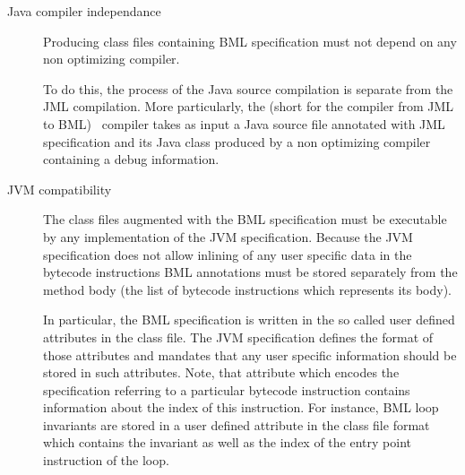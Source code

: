 \begin{description}

\item [Java compiler independance ] 
      Producing class files containing BML specification must not depend on 
      any non optimizing compiler. 
    
      To do this, the process of the Java source compilation is separate from the JML compilation. 
      More particularly, the \JMLtoBML (short for the compiler from JML to BML) \ compiler  takes as input a Java source file annotated with JML
      specification and its Java class produced by a non optimizing compiler containing a
      debug information.%
      

\item [JVM compatibility]
            The class files augmented with the BML specification must be executable by any
	    implementation of the JVM specification.
	     Because the JVM specification does not allow inlining of any user specific data in the bytecode instructions 
	    BML annotations must be stored separately from the method body (the list of bytecode instructions which represents its body).
	  
	    
	    In particular, the BML specification is written in the so
	    called user defined attributes in the class file.
	    The JVM specification defines the format of those attributes and mandates that any
	    user specific information should be stored in such attributes. 
	    Note, that attribute which encodes the specification  referring to a particular bytecode instruction contains
	    information about the index of this instruction. For instance,  BML loop invariants
	    are stored in a user defined attribute in the class file format which  contains the invariant
	    as well as the index of the entry point instruction of the loop.
	    

\end{description}
